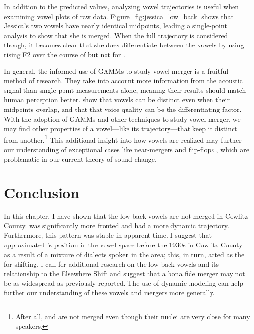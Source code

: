 In addition to the predicted values, analyzing vowel trajectories is useful when examining vowel plots of raw data. Figure~\ref{fig:jessica_low_back} shows that Jessica's two vowels have nearly identical midpoints, leading a single-point analysis to show that she is merged. When the full trajectory is considered though, it becomes clear that she does differentiate between the vowels by using rising F2 over the course of \thought but not for \lot.

In general, the informed use of GAMMs to study vowel merger is a fruitful method of research. They take into account more information from the acoustic signal than single-point measurements alone, meaning their results should match human perception better. \citet{dipaolo_faber_1990} show that vowels can be distinct even when their midpoints overlap, and that that voice quality can be the differentiating factor. With the adoption of GAMMs and other techniques to study vowel merger, we may find other properties of a vowel---like its trajectory---that keep it distinct from another.\footnote{After all, \price and \mouth are not merged even though their nuclei are very close for many speakers.} This additional insight into how vowels are realized may further our understanding of exceptional cases like near-mergers and flip-flops \citep{hall_lew_2013}, which are problematic in our current theory of sound change.

\section{Conclusion}

In this chapter, I have shown that the low back vowels are not merged in Cowlitz County. \lot was significantly more fronted and \thought had a more dynamic trajectory. Furthermore, this pattern was stable in apparent time. I suggest that \lot approximated \thought's position in the vowel space before the 1930s in Cowlitz County as a result of a mixture of dialects spoken in the area; this, in turn, acted as the for \trap shifting. I call for additional research on the low back vowels and its relationship to the Elsewhere Shift and suggest that a bona fide merger may not be as widespread as previously reported. The use of dynamic modeling can help further our understanding of these vowels and mergers more generally.
